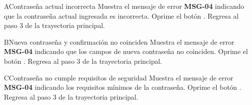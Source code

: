 \begin{UCtrayectoriaA}{A}{Contraseña actual incorrecta}
	\UCpaso Muestra el mensaje de error \textbf{MSG-04} indicando que la contraseña actual ingresada es incorrecta.
	\UCpaso[\UCactor] Oprime el botón .
	\UCpaso Regresa al paso 3 de la trayectoria principal.
\end{UCtrayectoriaA}

\begin{UCtrayectoriaA}{B}{Nueva contraseña y confirmación no coinciden}
	\UCpaso Muestra el mensaje de error \textbf{MSG-04} indicando que los campos de nueva contraseña no coinciden.
	\UCpaso[\UCactor] Oprime el botón .
	\UCpaso Regresa al paso 3 de la trayectoria principal.
\end{UCtrayectoriaA}

\begin{UCtrayectoriaA}{C}{Contraseña no cumple requisitos de seguridad}
	\UCpaso Muestra el mensaje de error \textbf{MSG-04} indicando los requisitos mínimos de la contraseña.
	\UCpaso[\UCactor] Oprime el botón .
	\UCpaso Regresa al paso 3 de la trayectoria principal.
\end{UCtrayectoriaA}

